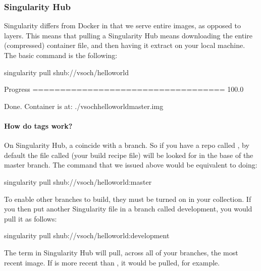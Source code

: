 \documentclass[letterpaper,10pt,english]{sphinxmanual}
\begin{document}
\subsubsection{Singularity Hub}
\label{\detokenize{appendix:singularity-hub}}
Singularity differs from Docker in that we serve entire images, as
opposed to layers. This means that pulling a Singularity Hub means
downloading the entire (compressed) container file, and then having it
extract on your local machine. The basic command is the following:

%
\begin{sphinxVerbatim}[commandchars=\\\{\}]
singularity pull shub://vsoch/hello\PYGZhy{}world

Progress \textbar{}===================================\textbar{} 100.0\PYGZpc{}

Done. Container is at: ./vsoch\PYGZhy{}hello\PYGZhy{}world\PYGZhy{}master.img
\end{sphinxVerbatim}


\paragraph{How do tags work?}
\label{\detokenize{appendix:how-do-tags-work}}
On Singularity Hub, a  coincide with a branch. So if you have a repo
called  , by default the file called  (your build recipe file) will be
looked for in the base of the master branch. The command that we issued
above would be equivalent to doing:

%
\begin{sphinxVerbatim}[commandchars=\\\{\}]
singularity pull shub://vsoch/hello\PYGZhy{}world:master
\end{sphinxVerbatim}

To enable other branches to build, they must be turned on in your
collection. If you then put another Singularity file in a branch called development,
you would pull it as follows:

%
\begin{sphinxVerbatim}[commandchars=\\\{\}]
singularity pull shub://vsoch/hello\PYGZhy{}world:development
\end{sphinxVerbatim}

The term  in Singularity Hub will pull, across all of your
branches, the most recent image. If  is more recent than
, it would be pulled, for example.
\end{document}

